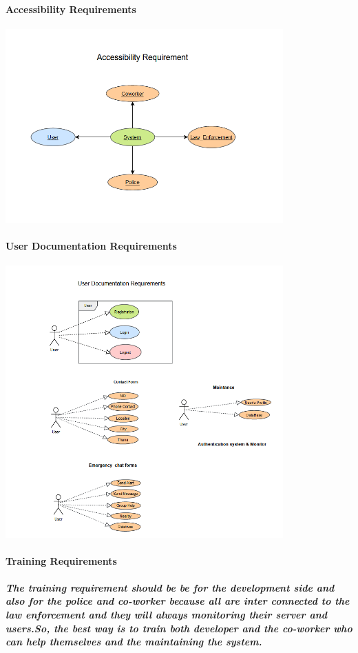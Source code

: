 \documentclass{article}
\begin{document}
\paragraph{Accessibility Requirements}
\includegraphics[width=0.8\textwidth]{Accessibility_Requirement.png}




\newpage
\paragraph{User Documentation Requirements}
\includegraphics[width=0.8\textwidth]{User_Documentation_Requirement.png}

\paragraph{Training Requirements}
\subparagraph{The training requirement should be  be for the development side and also for the police and co-worker because all are inter connected to the law enforcement and they will always monitoring their server and users.So, the best way is to train both developer and the co-worker who can help 
themselves and the maintaining the system.  }
\end{document}
